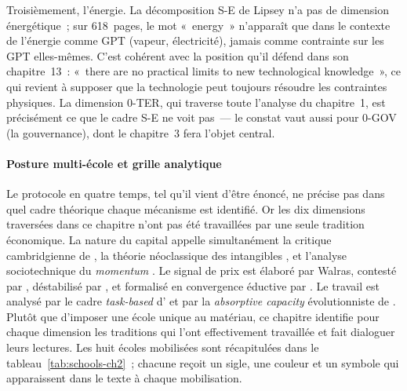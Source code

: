 Troisièmement, l'énergie. La décomposition S-E de Lipsey n'a pas de dimension énergétique~; sur 618~pages, le mot «~energy~» n'apparaît que dans le contexte de l'énergie comme GPT (vapeur, électricité), jamais comme contrainte sur les GPT elles-mêmes. C'est cohérent avec la position qu'il défend dans son chapitre~13~: «~there are no practical limits to new technological knowledge~», ce qui revient à supposer que la technologie peut toujours résoudre les contraintes physiques. La dimension 0-TER, qui traverse toute l'analyse du chapitre~1, est précisément ce que le cadre S-E ne voit pas~--- le constat vaut aussi pour 0-GOV (la gouvernance), dont le chapitre~3 fera l'objet central.

\paragraph{Posture multi-école et grille analytique}

Le protocole en quatre temps, tel qu'il vient d'être énoncé, ne précise pas dans quel cadre théorique chaque mécanisme est identifié. Or les dix dimensions traversées dans ce chapitre n'ont pas été travaillées par une seule tradition économique. La nature du capital appelle simultanément la critique cambridgienne de \textcite{robinson_production_1953}, la théorie néoclassique des intangibles \parencite{haskel_capitalism_2018}, et l'analyse sociotechnique du \emph{momentum} \parencite{hughes_networks_1983,unruh_understanding_2000}. Le signal de prix est élaboré par Walras, contesté par \textcite{hayek_use_1945}, déstabilisé par \textcite{stiglitz_contributions_2000}, et formalisé en convergence éductive par \textcite{guesnerie_eductive_1992}. Le travail est analysé par le cadre \emph{task-based} d'\textcite{acemoglu_race_2018} et par la \emph{absorptive capacity} évolutionniste de \textcite{cohen_absorptive_1990}. Plutôt que d'imposer une école unique au matériau, ce chapitre identifie pour chaque dimension les traditions qui l'ont effectivement travaillée et fait dialoguer leurs lectures. Les huit écoles mobilisées sont récapitulées dans le tableau~\ref{tab:schools-ch2}~; chacune reçoit un sigle, une couleur et un symbole qui apparaissent dans le texte à chaque mobilisation.

